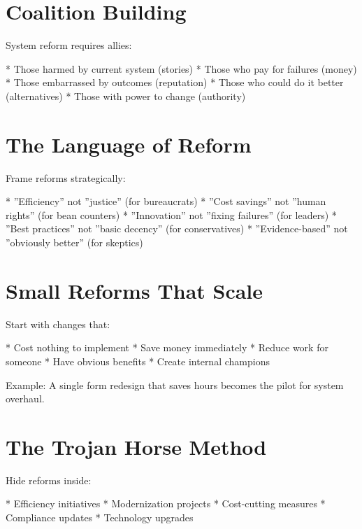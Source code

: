 \documentclass[12pt,oneside]{book}
\begin{document}
\section{Coalition Building}

System reform requires allies:

                    * Those harmed by current system (stories)
                    * Those who pay for failures (money)
                    * Those embarrassed by outcomes (reputation)
                    * Those who could do it better (alternatives)
                    * Those with power to change (authority)

\section{The Language of Reform}

Frame reforms strategically:

                    * ''Efficiency'' not ''justice'' (for bureaucrats)
                    * ''Cost savings'' not ''human rights'' (for bean counters)
                    * ''Innovation'' not ''fixing failures'' (for leaders)
                    * ''Best practices'' not ''basic decency'' (for conservatives)
                    * ''Evidence-based'' not ''obviously better'' (for skeptics)

\section{Small Reforms That Scale}

Start with changes that:

                    * Cost nothing to implement
                    * Save money immediately
                    * Reduce work for someone
                    * Have obvious benefits
                    * Create internal champions

Example: A single form redesign that saves hours becomes the pilot for system overhaul.

\section{The Trojan Horse Method}

Hide reforms inside:

                    * Efficiency initiatives
                    * Modernization projects
                    * Cost-cutting measures
                    * Compliance updates
                    * Technology upgrades
\end{document}
